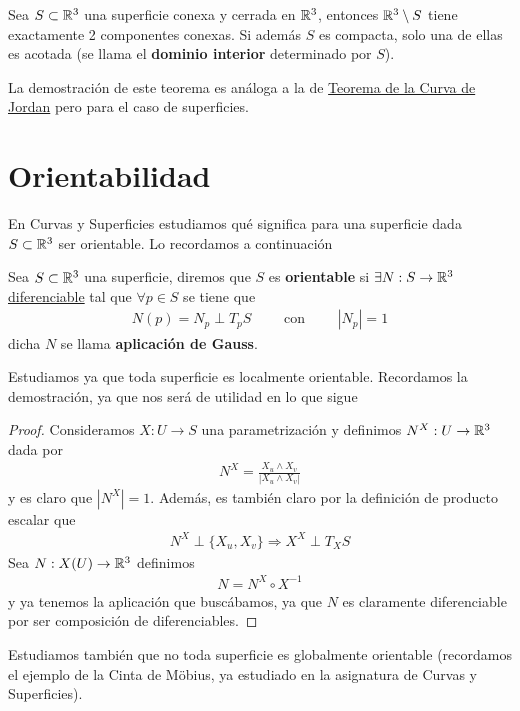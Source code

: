 \begin{teo}\label{teo:sep_jordan_brower}
    Sea $S\subset \mathbb{R}^3$ una superficie conexa y cerrada en $\mathbb{R}^3$, entonces $\mathbb{R}^3 \setminus S$ tiene exactamente 2 componentes conexas. Si además $S$ es compacta, solo una de ellas es acotada (se llama el \textbf{dominio interior} determinado por $S$).
\end{teo}

La demostración de este teorema es análoga a la de \hyperref[teo:curva_jordan]{Teorema de la Curva de Jordan} pero para el caso de superficies.

\section{Orientabilidad}

En Curvas y Superficies estudiamos qué significa para una superficie dada $S\subset \mathbb{R}^3$ ser orientable. Lo recordamos a continuación

\begin{definicion}
    Sea $S\subset \mathbb{R}^3$ una superficie, diremos que $S$ es \textbf{orientable} si $\exists N :S \to \mathbb{R}^3$ \underline{diferenciable} tal que $\forall p\in S$ se tiene que 
    \begin{gather*}
        N(p)=N_p \perp T_pS \qquad \text{ con } \qquad |N_p| = 1
    \end{gather*}
    dicha $N$ se llama \textbf{aplicación de Gauss}.
\end{definicion}

\begin{observacion}
    Estudiamos ya que toda superficie es localmente orientable. Recordamos la demostración, ya que nos será de utilidad en lo que sigue
    \begin{proof}
        Consideramos $X: U \to S$ una parametrización y definimos $N^X : U \to \mathbb{R}^3$ dada por
        \begin{gather*}
            N^X = \frac{X_u \wedge X_v}{|X_u \wedge X_v|}
        \end{gather*}
        y es claro que $|N^X| = 1$. Además, es también claro por la definición de producto escalar que 
        \begin{gather*}
            N^X \perp \{X_u, X_v\} \Rightarrow X^X \perp T_XS
        \end{gather*}
        Sea $N:X(U) \to \mathbb{R}^3$ definimos
        \begin{gather*}
            N = N^X \circ X^{-1}
        \end{gather*}
        y ya tenemos la aplicación que buscábamos, ya que $N$ es claramente diferenciable por ser composición de diferenciables.
    \end{proof}
    Estudiamos también que no toda superficie es globalmente orientable (recordamos el ejemplo de la Cinta de Möbius, ya estudiado en la asignatura de Curvas y Superficies).
\end{observacion}

